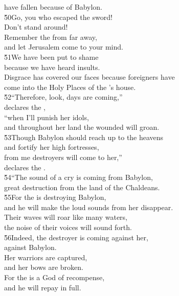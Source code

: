 \begin{poetry}
\poemll    have fallen because of Babylon. \\
\poeml \v{50}Go, you who escaped the sword! \\
\poemll    Don't stand around! \\
\poeml Remember the  from far away, \\
\poemll    and let Jerusalem come to your mind. \\
\poeml \v{51}We have been put to shame \\
\poemll    because we have heard insults. \\
\poeml Disgrace has covered our faces because foreigners have \\
\poemll    come into the Holy Places of the 's house. \\
\poeml \v{52}``Therefore, look, days are coming,'' \\
\poemll    declares the , \\
\poeml ``when I'll punish her idols, \\
\poemll    and throughout her land the wounded will groan. \\
\poeml \v{53}Though Babylon should reach up to the heavens \\
\poemll    and fortify her high fortresses, \\
\poeml from me destroyers will come to her,'' \\
\poemll    declares the . \\
\poeml \v{54}``The sound of a cry is coming from Babylon, \\
\poemll    great destruction from the land of the Chaldeans. \\
\poeml \v{55}For the  is destroying Babylon, \\
\poemll    and he will make the loud sounds from her disappear. \\
\poeml Their waves will roar like many waters, \\
\poemll    the noise of their voices will sound forth. \\
\poeml \v{56}Indeed, the destroyer is coming against her, \\
\poemll    against Babylon. \\
\poeml Her warriors are captured, \\
\poemll    and her bows are broken. \\
\poeml For the  is a God of recompense, \\
\poemll    and he will repay in full. \\

\end{poetry}
